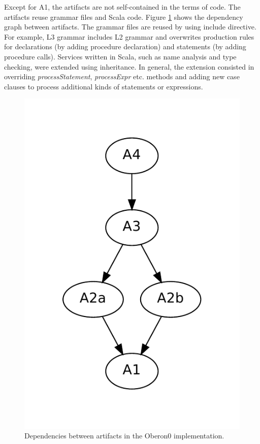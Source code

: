Except for A1, the artifacts are not self-contained in the terms of
code. The artifacts reuse grammar files and Scala code. Figure \ref{fig:artifact-dependencies}
shows the dependency graph between artifacts. The grammar files are
reused by using include directive. For example, L3 grammar includes
L2 grammar and overwrites production rules for declarations (by adding
procedure declaration) and statements (by adding procedure calls).
Services written in Scala, such as name analysis and type checking,
were extended using inheritance. In general, the extension consisted
in overriding \emph{processStatement}, \emph{processExpr} etc. methods
and adding new case clauses to process additional kinds of statements
or expressions.

%
\begin{figure}[!h]
\noindent \begin{centering}
\includegraphics[scale=0.5]{simpl/artifacts.pdf}
\par\end{centering}

\caption{\label{fig:artifact-dependencies}Dependencies between artifacts in
the Oberon0 implementation.}

\end{figure}


